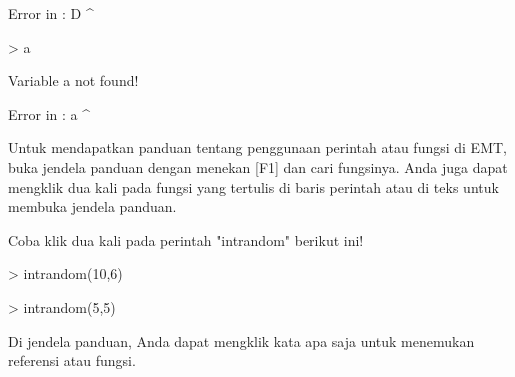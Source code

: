 \documentclass[a4paper,10pt]{article}
\begin{document}
\begin{eulernotebook}
\begin{eulercomment}
\begin{eulercomment}
\begin{euleroutput}
  Error in :
   D
    ^
\end{euleroutput}
\begin{eulerprompt}
> a
\end{eulerprompt}
\begin{euleroutput}
  Variable a not found!
  
  Error in :
   a
    ^
\end{euleroutput}
\begin{eulercomment}
Untuk mendapatkan panduan tentang penggunaan perintah atau fungsi di
EMT, buka jendela panduan dengan menekan [F1] dan cari fungsinya. Anda
juga dapat mengklik dua kali pada fungsi yang tertulis di baris
perintah atau di teks untuk membuka jendela panduan.

Coba klik dua kali pada perintah "intrandom" berikut ini!
\end{eulercomment}
\begin{eulerprompt}
> intrandom(10,6)
\end{eulerprompt}
\begin{euleroutput}
  [4,  2,  6,  2,  4,  2,  3,  2,  2,  6]
\end{euleroutput}
\begin{eulerprompt}
> intrandom(5,5)
\end{eulerprompt}
\begin{euleroutput}
  [3,  3,  1,  2,  5]
\end{euleroutput}
\begin{eulercomment}
Di jendela panduan, Anda dapat mengklik kata apa saja untuk menemukan
referensi atau fungsi.


\end{eulercomment}
\end{eulercomment}
\end{eulercomment}
\end{eulernotebook}
\end{document}
